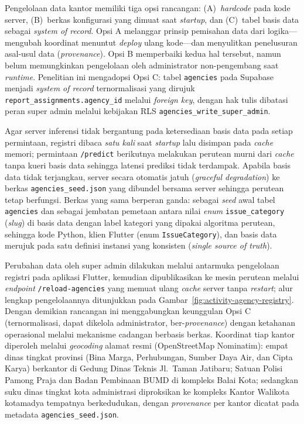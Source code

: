 Pengelolaan data kantor memiliki tiga opsi rancangan: (A)~\textit{hardcode} pada kode server, (B)~berkas konfigurasi yang dimuat saat \textit{startup}, dan (C)~tabel basis data sebagai \textit{system of record}. Opsi A melanggar prinsip pemisahan data dari logika---mengubah koordinat menuntut \textit{deploy} ulang kode---dan menyulitkan penelusuran asal-usul data (\textit{provenance}). Opsi B memperbaiki kedua hal tersebut, namun belum memungkinkan pengelolaan oleh administrator non-pengembang saat \textit{runtime}. Penelitian ini mengadopsi Opsi C: tabel \texttt{agencies} pada Supabase menjadi \textit{system of record} ternormalisasi yang dirujuk \texttt{report\_assignments.agency\_id} melalui \textit{foreign key}, dengan hak tulis dibatasi peran super admin melalui kebijakan RLS \texttt{agencies\_write\_super\_admin}.

Agar server inferensi tidak bergantung pada ketersediaan basis data pada setiap permintaan, registri dibaca \emph{satu kali} saat \textit{startup} lalu disimpan pada \textit{cache} memori; permintaan \texttt{/predict} berikutnya melakukan perutean murni dari \textit{cache} tanpa kueri basis data sehingga latensi prediksi tidak terdampak. Apabila basis data tidak terjangkau, server secara otomatis jatuh (\textit{graceful degradation}) ke berkas \texttt{agencies\_seed.json} yang dibundel bersama server sehingga perutean tetap berfungsi. Berkas yang sama berperan ganda: sebagai \textit{seed} awal tabel \texttt{agencies} dan sebagai jembatan pemetaan antara nilai \textit{enum} \texttt{issue\_category} (\textit{slug}) di basis data dengan label kategori yang dipakai algoritma perutean, sehingga kode Python, klien Flutter (enum \texttt{IssueCategory}), dan basis data merujuk pada satu definisi instansi yang konsisten (\textit{single source of truth}).

Perubahan data oleh super admin dilakukan melalui antarmuka pengelolaan registri pada aplikasi Flutter, kemudian dipublikasikan ke mesin perutean melalui \textit{endpoint} \texttt{/reload-agencies} yang memuat ulang \textit{cache} server tanpa \textit{restart}; alur lengkap pengelolaannya ditunjukkan pada Gambar~\ref{fig:activity-agency-registry}. Dengan demikian rancangan ini menggabungkan keunggulan Opsi C (ternormalisasi, dapat dikelola administrator, ber-\textit{provenance}) dengan ketahanan operasional melalui mekanisme cadangan berbasis berkas. Koordinat tiap kantor diperoleh melalui \textit{geocoding} alamat resmi (OpenStreetMap Nominatim): empat dinas tingkat provinsi (Bina Marga, Perhubungan, Sumber Daya Air, dan Cipta Karya) berkantor di Gedung Dinas Teknis Jl.\ Taman Jatibaru; Satuan Polisi Pamong Praja dan Badan Pembinaan BUMD di kompleks Balai Kota; sedangkan suku dinas tingkat kota administrasi diproksikan ke kompleks Kantor Walikota kotamadya tempatnya berkedudukan, dengan \textit{provenance} per kantor dicatat pada metadata \texttt{agencies\_seed.json}.

